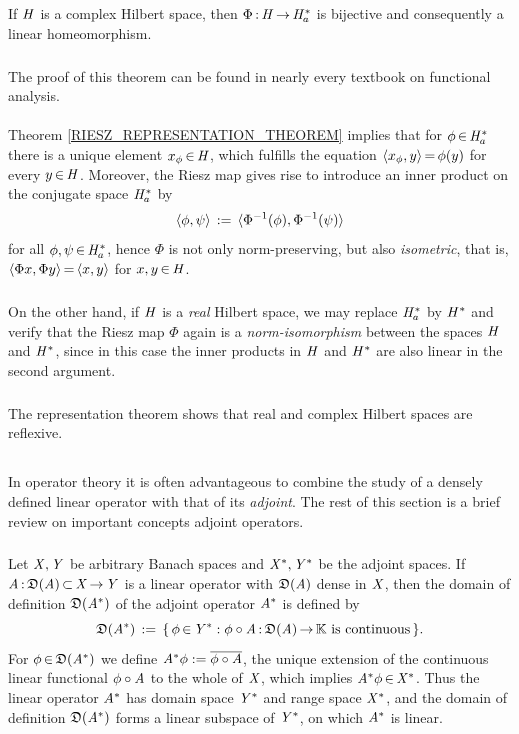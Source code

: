 \documentclass[11pt,twoside]{article}
\begin{document}
\begin{theorem}\label{RIESZ_REPRESENTATION_THEOREM}
If $\mathit{H}$ is a complex Hilbert space,
then $\Phi{\,:\,} \mathit{H} {\,\to\,} \mathit{H}_a^*$ is bijective and 
consequently a linear homeomorphism.
\end{theorem}

\subparagraph{}
The proof of this theorem can be found in nearly every textbook
on functional analysis.

\paragraph{} %
Theorem \ref{RIESZ_REPRESENTATION_THEOREM} implies that
for $\phi {\,\in\,} \mathit{H}_a^*$ there is a unique element $x_{\phi} {\,\in\,} \mathit{H}$,
which fulfills the equation
$\langle x_{\phi},y \rangle {\,=\,} \phi(y)$ for every $y {\,\in\,} \mathit{H}$.
Moreover,
the Riesz map gives rise to introduce an inner product
on the conjugate space $\mathit{H}_a^*$ by
\[
\langle \phi,\psi \rangle \,:=\, \langle \Phi^{-1}(\phi),\Phi^{-1}(\psi) \rangle
\]
for all $\phi,\psi {\,\in\,} \mathit{H}_a^*$,
hence $\Phi$ is not only norm-preserving,
but also \textit{isometric},
that is,
$\langle \Phi x,\Phi y \rangle {\,=\,} \langle x,y \rangle$ for $x,y {\,\in\,} \mathit{H}$.

\subparagraph{} %
On the other hand,
if $\mathit{H}$ is a \textit{real} Hilbert space,
we may replace $\mathit{H}_a^*$ by $\mathit{H}^*$ and verify
that the Riesz map $\Phi$ again is a \textit{norm-isomorphism}
between the spaces $\mathit{H}$ and $\mathit{H}^*$,
since in this case
the inner products in $\mathit{H}$ and $\mathit{H}^*$
are also linear in the second argument.

\subparagraph*{}
The representation theorem shows that
real and complex Hilbert spaces are reflexive.

\subsection{} %
In operator theory it is often advantageous to combine
the study of a densely defined linear operator
with that of its \textit{adjoint}.
The rest of this section is a brief review
on important concepts {\wrt} adjoint operators.

\subparagraph{} %
Let $\mathit{X},\mathit{Y}$ be arbitrary Banach spaces and
$\mathit{X}^*,\mathit{Y}^*$ be the adjoint spaces.
If $\mathit{A} {\,:\,} \mathfrak{D}(\mathit{A}) {\,\subset\,} \mathit{X} {\,\to\,} \mathit{Y}$
is a linear operator with $\mathfrak{D}(\mathit{A})$ dense in $\mathit{X}$,
then the domain of definition $\mathfrak{D}(\mathit{A}^*)$
of the {adjoint operator} $\mathit{A}^*$ is defined by
\[
\mathfrak{D}(\mathit{A}^*) \,:=\,
\{\, \phi {\,\in\,} \mathit{Y}^*:
\phi \circ \mathit{A} {\,:\,} \mathfrak{D}(\mathit{A}) {\,\to\,} {\mathbb{K}} \mbox{ is continuous}\,\}.
\]
For $\phi {\,\in\,} \mathfrak{D}(\mathit{A}^*) $ we define
$\mathit{A}^* \phi := \overline{\phi \circ \mathit{A}}$,
the unique extension of the continuous linear functional
$\phi \circ \mathit{A}$ to the whole of $\mathit{X}$,
which implies $\mathit{A}^* \phi {\,\in\,} \mathit{X}^*$.
Thus the linear operator $\mathit{A}^*$
has domain space $\mathit{Y}^*$ and range space $\mathit{X}^*$,
and the domain of definition $\mathfrak{D}(\mathit{A}^*)$
forms a linear subspace of $\mathit{Y}^*$,
on which $\mathit{A}^*$ is linear.
\end{document}
